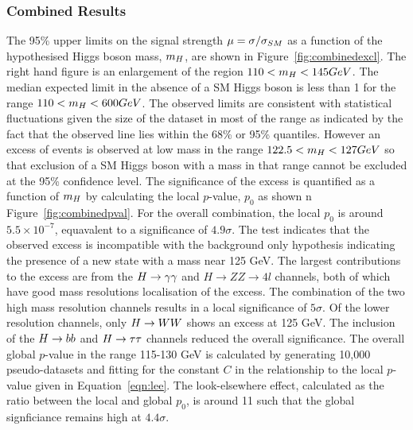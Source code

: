 \subsubsection{Combined Results}
The 95\% upper limits on the signal strength $\mu=\sigma/\sigma_{SM}$ as a function 
of the hypothesised Higgs boson mass, $m_{H}$, are shown in 
Figure~\ref{fig:combinedexcl}. The right hand figure is an enlargement of
the region $110 < m_{H}  < 145 GeV$. The median expected limit in the absence
of a SM Higgs boson is less than 1 for the range $110< m_{H}<600 GeV$. 
The observed limits are consistent with statistical fluctuations given the 
size of the dataset in most of the range as indicated by the fact that the 
observed line lies within the 68\% or 95\% quantiles. However an
excess of events is observed at low mass in the range $122.5  < m_{H} < 127 GeV$
so that exclusion of a SM Higgs boson with a mass in that range cannot be excluded
at the 95\% confidence level. The significance of the excess is quantified as a function
of $m_{H}$ by calculating the local $p$-value, $p_{0}$ as shown n Figure~\ref{fig:combinedpval}. 
For the overall combination, the local $p_{0}$ is around $5.5\times10^{-7}$, 
equavalent to a significance of $4.9\sigma$. The test indicates that the observed excess 
is incompatible with the background only hypothesis indicating the presence of 
a new state with a mass near 125 GeV.
The largest contributions to the excess are
from the $H\rightarrow\gamma\gamma$ and $H\rightarrow ZZ\rightarrow4l$ channels, 
both of which have good mass resolutions localisation
of the excess. The combination of the two 
high mass resolution channels results in a local significance of $5\sigma$. 
Of the lower resolution channels, only $H\rightarrow WW$ shows an excess at 125 GeV. The inclusion
of the $H\rightarrow bb$ and $H\rightarrow\tau\tau$ channels reduced the overall significance.
The overall global $p$-value in the range 115-130 GeV is calculated by 
generating 10,000 pseudo-datasets and fitting for the constant $C$ in 
the relationship to the local $p$-value given in Equation~\ref{eqn:lee}. The
look-elsewhere effect, calculated as the ratio between the local and global $p_{0}$, 
is around 11 such that the global signficiance remains high at $4.4\sigma$.

